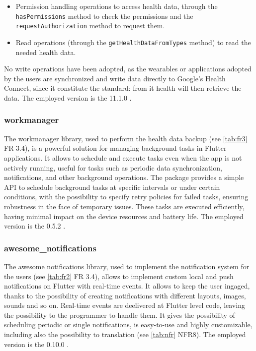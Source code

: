 \begin{itemize}[nosep] %
    \item Permission handling operations to access health data, through the \texttt{hasPermissions} method to check the permissions and the \texttt{requestAuthorization} method to request them.
    \item Read operations (through the \texttt{getHealthDataFromTypes} method) to read the needed health data.
\end{itemize}

\noindent No write operations have been adopted, as the wearables or applications adopted by the users are synchronized and write data directly to Google's Health Connect, since it constitute the standard: from it health will then retrieve the data. The employed version is the 11.1.0 \cite{Health}.

\subsubsection{workmanager}
The workmanager library, used to perform the health data backup (see \cref{tab:fr3} FR 3.4), is a powerful solution for managing background tasks in Flutter applications. It allows to schedule and execute tasks even when the app is not actively running, useful for tasks such as periodic data synchronization, notifications, and other background operations. The package provides a simple API to schedule background tasks at specific intervals or under certain conditions, with the possibility to specify retry policies for failed tasks, ensuring robustness in the face of temporary issues. These tasks are executed efficiently, having minimal impact on the device resources and battery life. The employed version is the 0.5.2 \cite{Workmanager}.
\subsubsection{awesome\_notifications}
The awesome notifications library, used to implement the notification system for the users (see \cref{tab:fr2} FR 3.4), allows to implement custom local and push notifications on Flutter with real-time events. It allows to keep the user ingaged, thanks to the possibility of creating notifications with different layouts, images, sounds and so on. Real-time events are deelivered at Flutter level code, leaving the possibility to the programmer to handle them. It gives the possibility of scheduling periodic or single notifications, is easy-to-use and highly customizable, including also the possibility to translation (see \cref{tab:nfr} NFR8). The employed version is the 0.10.0 \cite{AwesomeNotifications}.
